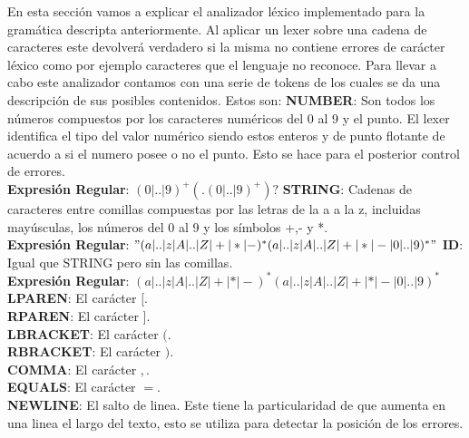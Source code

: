 En esta sección vamos a explicar el analizador léxico implementado para la gramática descripta anteriormente. Al aplicar un
lexer sobre una cadena de caracteres este devolverá verdadero si la misma no contiene errores de carácter léxico como por
ejemplo caracteres que el lenguaje no reconoce. Para llevar a cabo este analizador contamos con una serie de tokens de
los cuales se da una descripción de sus posibles contenidos. Estos son:
\newline
\newline
\textbf{NUMBER}: Son todos los números compuestos por los caracteres numéricos del 0 al 9 y el punto. El lexer identifica el tipo
del valor numérico siendo estos enteros y de punto flotante de acuerdo a si el numero posee o no el punto. Esto se hace
para el posterior control de errores.\\
\textbf{Expresi\'on Regular}: $(0|..|9)^{+}(.(0|..|9)^{+})?$
\newline
\newline
\textbf{STRING}: Cadenas de caracteres entre comillas compuestas por las letras de la a a la z, incluidas mayúsculas, los números del
0 al 9 y los símbolos +,- y *.\\
\textbf{Expresi\'on Regular}: $"(a|..|z|A|..|Z|+|*|-)^{*}(a|..|z|A|..|Z|+|*|-|0|..|9)^{*}"$
\newline
\newline
\textbf{ID}: Igual que STRING pero sin las comillas.\\
\textbf{Expresi\'on Regular}: $(a|..|z|A|..|Z|+|*|-)^{*}(a|..|z|A|..|Z|+|*|-|0|..|9)^{*}$
\newline
\newline
\textbf{LPAREN}: El carácter $[$.\\
\newline
\textbf{RPAREN}: El carácter $]$.\\
\newline
\textbf{LBRACKET}: El carácter $($.\\
\newline
\textbf{RBRACKET}: El carácter $)$.\\
\newline
\textbf{COMMA}: El carácter $,$.\\
\newline
\textbf{EQUALS}: El carácter $=$.\\
\newline
\textbf{NEWLINE}: El salto de linea. Este tiene la particularidad de que aumenta en una linea el largo del texto, esto se
utiliza para detectar la posición de los errores.\\
